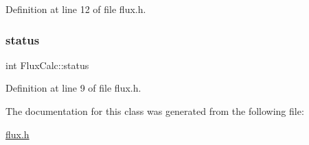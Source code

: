 Definition at line 12 of file flux.\+h.

\mbox{\label{classFluxCalc_a787e2be1064214bc02417c2c073fd6f8}} 
\subsubsection{\texorpdfstring{status}{status}}
{\footnotesize\ttfamily int Flux\+Calc\+::status\hspace{0.3cm}{\ttfamily [private]}}



Definition at line 9 of file flux.\+h.



The documentation for this class was generated from the following file\+:\begin{DoxyCompactItemize}
\item 
\hyperlink{flux_8h}{flux.\+h}\end{DoxyCompactItemize}
